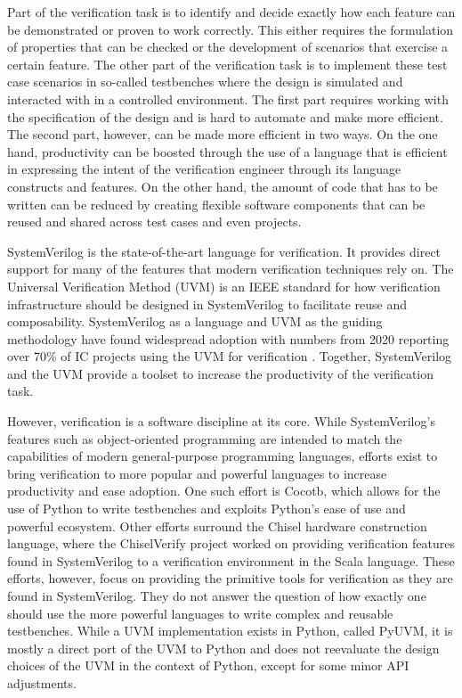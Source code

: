 Part of the verification task is to identify and decide exactly how each feature can be demonstrated or proven to
work correctly. This either requires the formulation of properties that can be checked or the development of
scenarios that exercise a certain feature. The other part of the verification task is to implement these test case
scenarios in so-called testbenches where the design is simulated and interacted with in a controlled environment. The
first part requires working with the specification of the design and is hard to automate and make more efficient. The
second part, however, can be made more efficient in two ways. On the one hand, productivity can be boosted through the
use of a language that is efficient in expressing the intent of the verification engineer through its language
constructs and features. On the other hand, the amount of code that has to be written can be reduced by creating
flexible software components that can be reused and shared across test cases and even projects.

SystemVerilog is the state-of-the-art language for verification. It provides direct support for many
of the features that modern verification techniques rely on. The Universal Verification Method (UVM) is an IEEE
standard for how verification infrastructure should be designed in SystemVerilog to facilitate reuse and
composability. SystemVerilog as a language and UVM as the guiding methodology have found widespread adoption with
numbers from 2020 reporting over 70\% of IC projects using the UVM for verification \cite{foster2020wilson}.
Together, SystemVerilog and the UVM provide a toolset to increase the productivity of the verification task.

However, verification is a software discipline at its core. While SystemVerilog's features such as object-oriented
programming are intended to match the capabilities of modern general-purpose programming languages, efforts exist to
bring verification to more popular and powerful languages to increase productivity and ease adoption. One such effort
is Cocotb, which allows for the use of Python to write testbenches and exploits Python's ease of use and powerful
ecosystem. Other efforts surround the Chisel hardware construction language, where the ChiselVerify project worked on
providing verification features found in SystemVerilog to a verification environment in the Scala language. These efforts, however,
focus on providing the primitive tools for verification as they are found in SystemVerilog. They do not answer the
question of how exactly one should use the more powerful languages to write complex and reusable testbenches. While a
UVM implementation exists in Python, called PyUVM, it is mostly a direct port of the UVM to Python and does not reevaluate
the design choices of the UVM in the context of Python, except for some minor API adjustments.

